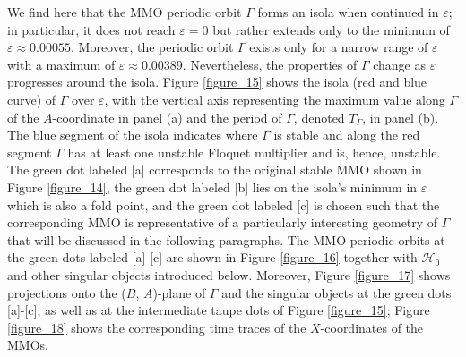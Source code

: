 \documentclass{ws-ijbc}
\begin{document}
We find here that the MMO periodic orbit $\Gamma$ forms an isola when continued in $\varepsilon$; in particular, it does not reach $\varepsilon=0$ but rather extends only to the minimum of $\varepsilon \approx 0.00055$.  Moreover, the periodic orbit $\Gamma$ exists only for a narrow range of $\varepsilon$ with a maximum of $\varepsilon \approx 0.00389$.  Nevertheless, the properties of $\Gamma$ change as $\varepsilon$ progresses around the isola.  Figure \ref{figure_15} shows the isola (red and blue curve) of $\Gamma$ over $\varepsilon$, with the vertical axis representing the maximum value along $\Gamma$ of the $A$-coordinate in panel (a) and the period of $\Gamma$, denoted $T_\Gamma$, in panel (b).  The blue segment of the isola indicates where $\Gamma$ is stable and along the red segment $\Gamma$ has at least one unstable Floquet multiplier and is, hence, unstable.  The green dot labeled [a] corresponds to the original stable MMO shown in Figure \ref{figure_14}, the green dot labeled [b] lies on the isola's minimum in $\varepsilon$ which is also a fold point, and the green dot labeled [c] is chosen such that the corresponding MMO is representative of a particularly interesting geometry of $\Gamma$ that will be discussed in the following paragraphs.  The MMO periodic orbits at the green dots labeled [a]-[c] are shown in Figure \ref{figure_16} together with $\mathscr{H}_0$ and other singular objects introduced below.  Moreover, Figure \ref{figure_17} shows projections onto the ($B$, $A$)-plane of $\Gamma$ and the singular objects at the green dots [a]-[c], as well as at the intermediate taupe dots of Figure \ref{figure_15}; Figure \ref{figure_18} shows the corresponding time traces of the $X$-coordinates of the MMOs.
\end{document}
